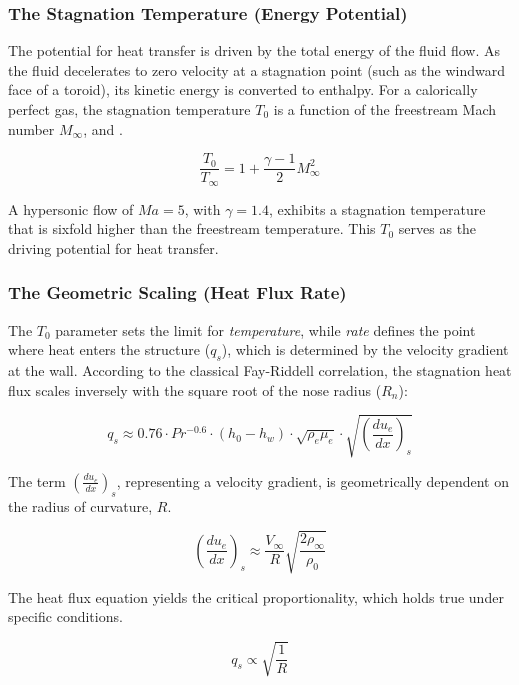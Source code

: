 \subsubsection*{The Stagnation Temperature (Energy Potential)}
The potential for heat transfer is driven by the total energy of the fluid flow. As the fluid decelerates to zero velocity at a stagnation point (such as the windward face of a toroid), its kinetic energy is converted to enthalpy. For a calorically perfect gas, the stagnation temperature $T_0$ is a function of the freestream Mach number $M_{\infty}$, and \cite{AndersonHypersonic}.

\begin{equation}
    \frac{T_0}{T_{\infty}} = 1 + \frac{\gamma - 1}{2} M_{\infty}^2
\end{equation}

A hypersonic flow of $Ma=5$, with $\gamma=1.4$, exhibits a stagnation temperature that is sixfold higher than the freestream temperature. This $T_0$ serves as the driving potential for heat transfer.

\subsubsection*{The Geometric Scaling (Heat Flux Rate)}
The $T_0$ parameter sets the limit for \textit{temperature}, while \textit{rate} defines the point where heat enters the structure ($q_s$), which is determined by the velocity gradient at the wall. According to the classical Fay-Riddell correlation, the stagnation heat flux scales inversely with the square root of the nose radius ($R_n$):

\begin{equation}
    q_s \approx 0.76 \cdot Pr^{-0.6} \cdot (h_{0} - h_w) \cdot \sqrt{\rho_e \mu_e} \cdot \sqrt{\left( \frac{du_e}{dx} \right)_s}
\end{equation}

The term $\left( \frac{du_e}{dx} \right)_s$, representing a velocity gradient, is geometrically dependent on the radius of curvature, $R$.

\begin{equation}
    \left( \frac{du_e}{dx} \right)_s \approx \frac{V_{\infty}}{R} \sqrt{\frac{2 \rho_{\infty}}{\rho_{0}}}
\end{equation}

The heat flux equation yields the critical proportionality, which holds true under specific conditions.

\begin{equation}
    q_s \propto \sqrt{\frac{1}{R}}
\end{equation}

